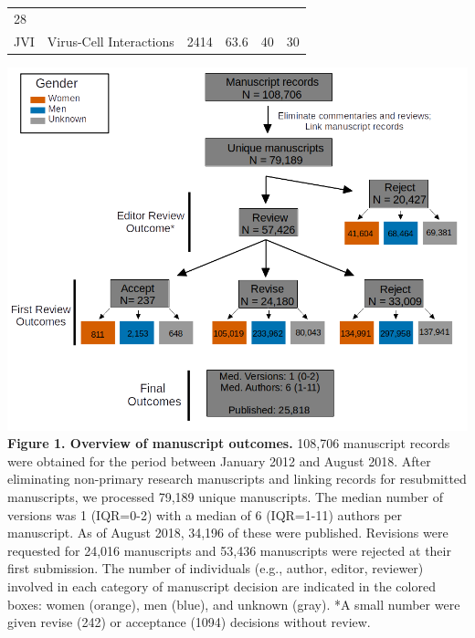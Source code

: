 \documentclass[11pt,]{article}
\begin{document}
\begin{longtable}[]{@{}llrrrr@{}}
\begin{minipage}[t]{0.11\columnwidth}
28\strut
\end{minipage}\tabularnewline
\begin{minipage}[t]{0.06\columnwidth}\raggedright\strut
JVI\strut
\end{minipage} & \begin{minipage}[t]{0.43\columnwidth}\raggedright\strut
Virus-Cell Interactions\strut
\end{minipage} & \begin{minipage}[t]{0.04\columnwidth}\raggedleft\strut
2414\strut
\end{minipage} & \begin{minipage}[t]{0.08\columnwidth}\raggedleft\strut
63.6\strut
\end{minipage} & \begin{minipage}[t]{0.11\columnwidth}\raggedleft\strut
40\strut
\end{minipage} & \begin{minipage}[t]{0.11\columnwidth}\raggedleft\strut
30\strut
\end{minipage}\tabularnewline
\bottomrule
\end{longtable}

\newpage

\includegraphics{population_diagram.png} \textbf{Figure 1. Overview of
manuscript outcomes.} 108,706 manuscript records were obtained for the
period between January 2012 and August 2018. After eliminating
non-primary research manuscripts and linking records for resubmitted
manuscripts, we processed 79,189 unique manuscripts. The median number
of versions was 1 (IQR=0-2) with a median of 6 (IQR=1-11) authors per
manuscript. As of August 2018, 34,196 of these were published. Revisions
were requested for 24,016 manuscripts and 53,436 manuscripts were
rejected at their first submission. The number of individuals (e.g.,
author, editor, reviewer) involved in each category of manuscript
decision are indicated in the colored boxes: women (orange), men (blue),
and unknown (gray). *A small number were given revise (242) or
acceptance (1094) decisions without review.
\end{document}
